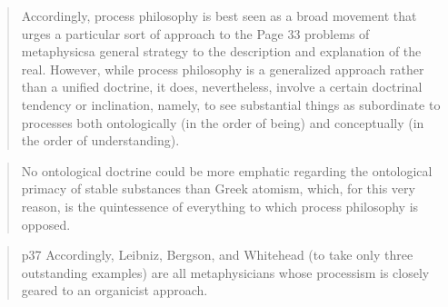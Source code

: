 \documentclass[a4paper]{Thesis}
\begin{document}
\begin{quotation}
	Accordingly, process philosophy is best seen as a broad movement that urges a particular
	sort of approach to the
	Page 33
	problems of metaphysicsa general strategy to the description and explanation of the real.
	However, while process philosophy is a generalized approach rather than a unified
	doctrine, it does, nevertheless, involve a certain doctrinal tendency or inclination, namely,
	to see substantial things as subordinate to processes both ontologically (in the order of
	being) and conceptually (in the order of understanding).	
\end{quotation}


\begin{quotation}
	No ontological doctrine could be more emphatic regarding the ontological primacy of
	stable substances than Greek atomism, which, for this very reason, is the quintessence of
	everything to which process philosophy is opposed.	
\end{quotation}

\begin{quotation}
	p37
	Accordingly, Leibniz, Bergson, and Whitehead (to take only three outstanding examples)
	are all metaphysicians whose processism is closely geared to an organicist approach.
\end{quotation}
\end{document}
